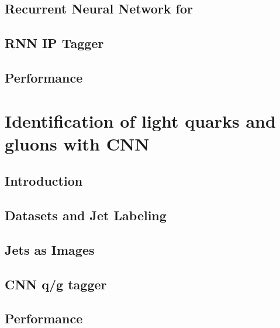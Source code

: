 \documentclass{report}
\begin{document}
\section{Recurrent Neural Network for \btagging}

\clearpage

\section{RNN IP Tagger}

\clearpage

\section{Performance}


\clearpage


\chapter{Identification of light quarks and gluons with CNN}
\label{chap:qgtagging}
\section{Introduction}


\clearpage

\section{Datasets and Jet Labeling}

\clearpage

\section{Jets as Images}

\clearpage

%

\section{CNN q/g tagger}

\clearpage

\section{Performance}

\clearpage
\end{document}
